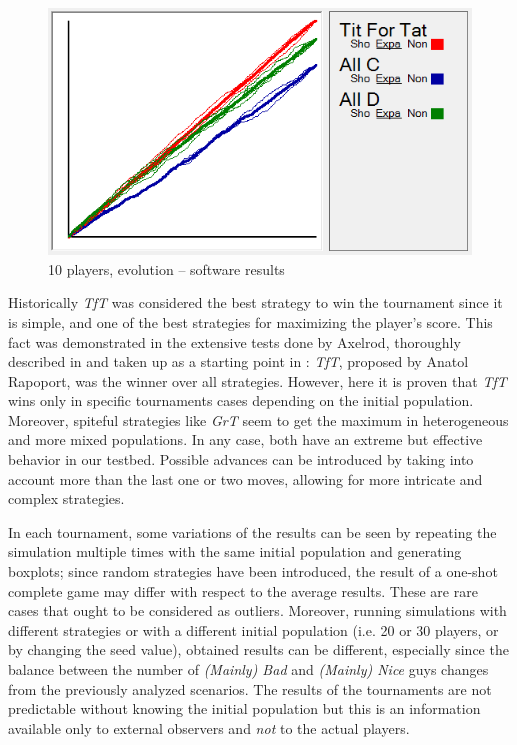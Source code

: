 \documentclass[journal,10pt,twoside]{IEEEtran}
\begin{document}
\begin{figure}[!ht]
    \centering
    \includegraphics[width=.7\columnwidth]{../img/ipdmp/ipdmp10-plot-det}
    \caption{10 players, evolution -- software results \cite{demosw}}
    \label{fig:ipdmp10evosw}
\end{figure}

Historically \textit{TfT} was considered the best strategy to win the tournament since it is simple, and one of the best strategies for maximizing the player's score.
This fact was demonstrated in the extensive tests done by Axelrod, thoroughly described in \cite{axelrod1981evolution,axelrod1984evolution} and taken up as a starting point in \cite{mathieu2017}: \textit{TfT}, proposed by Anatol Rapoport, was the winner over all strategies.
However, here it is proven that \textit{TfT} wins only in specific tournaments cases depending on the initial population. Moreover, spiteful strategies like \textit{GrT} seem to get the maximum in heterogeneous and more mixed populations. In any case, both have an extreme but effective behavior in our testbed. Possible advances can be introduced by taking into account more than the last one or two moves, allowing for more intricate and complex strategies.~\cite{mathieu2017}

In each tournament, some variations of the results can be seen by repeating the simulation multiple times with the same initial population and generating boxplots; since random strategies have been introduced, the result of a one-shot complete game may differ with respect to the average results. These are rare cases that ought to be considered as outliers. Moreover, running simulations with different strategies or with a different initial population (i.e. 20 or 30 players, or by changing the seed value), obtained results can be different, especially since the balance between the number of \textit{(Mainly) Bad} and \textit{(Mainly) Nice} guys changes from the previously analyzed scenarios. The results of the tournaments are not predictable without knowing the initial population but this is an information available only to external observers and \textit{not} to the actual players. 
\end{document}
